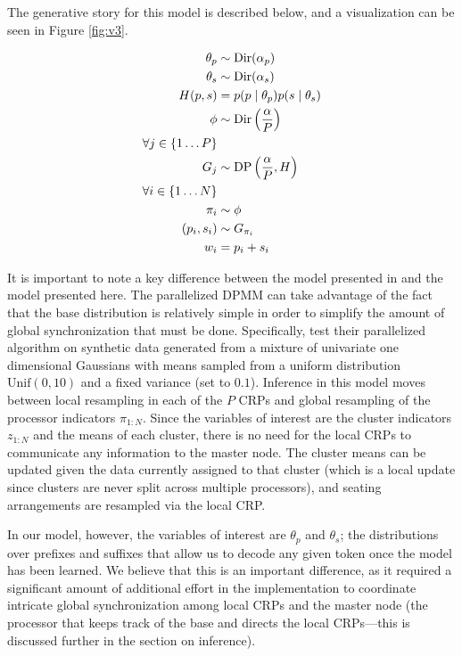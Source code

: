 The generative story for this model is described below, and a
visualization can be seen in Figure \ref{fig:v3}.

\begin{align*}
  \theta_p & \sim \mathrm{Dir}(\alpha_p) \\
  \theta_s & \sim \mathrm{Dir}(\alpha_s) \\
  H(p, s) & = p(p \mid \theta_p) p(s \mid \theta_s) \\
  \phi & \sim \mathrm{Dir}\left(\frac{\alpha}{P}\right) \\
  \forall j \in \{1 \dots P\} \\
  G_j & \sim \mathrm{DP}\left(\frac{\alpha}{P}, H\right)\\
  \forall i \in \{1 \dots N\} \\
  \pi_i & \sim \phi \\
  (p_i, s_i) & \sim G_{\pi_i} \\
  w_i & = p_i+s_i
\end{align*}

It is important to note a key difference between the model presented
in \cite{williamson2013} and the model presented here. The
parallelized DPMM can take advantage of the fact that the base
distribution is relatively simple in order to simplify the amount of
global synchronization that must be done. Specifically,
\cite{williamson2013} test their parallelized algorithm on synthetic
data generated from a mixture of univariate one dimensional Gaussians
with means sampled from a uniform distribution $\text{Unif}(0, 10)$
and a fixed variance (set to $0.1$). Inference in this model moves
between local resampling in each of the $P$ CRPs and global resampling
of the processor indicators $\pi_{1:N}$. Since the variables of
interest are the cluster indicators $z_{1:N}$ and the means of each
cluster, there is no need for the local CRPs to communicate any
information to the master node. The cluster means can be updated given
the data currently assigned to that cluster (which is a local update
since clusters are never split across multiple processors), and
seating arrangements are resampled via the local CRP.

In our model, however, the variables of interest are $\theta_p$ and
$\theta_s$; the distributions over prefixes and suffixes that allow us
to decode any given token once the model has been learned. We believe
that this is an important difference, as it required a significant
amount of additional effort in the implementation to coordinate
intricate global synchronization among local CRPs and the master node
(the processor that keeps track of the base and directs the local
CRPs---this is discussed further in the section on inference).

